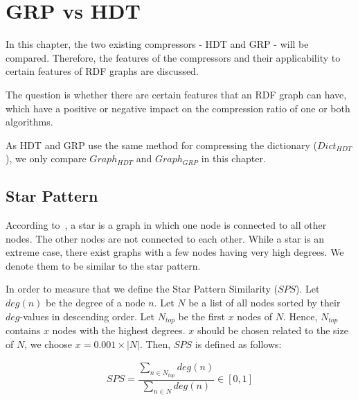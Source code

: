 \section{GRP vs HDT}\label{sec:approachGRPvsHDT}

In this chapter, the two existing compressors - HDT and GRP - will be compared. Therefore, the features of the compressors and their applicability to certain features of RDF graphs are discussed.

The question is whether there are certain features that an RDF graph can have, which have a positive or negative impact on the compression ratio of one or both algorithms. 

As HDT and GRP use the same method for compressing the dictionary ($Dict_{HDT}$), we only compare $Graph_{HDT}$ and $Graph_{GRP}$ in this chapter.



\subsection{Star Pattern}\label{sec:approachStarPattern}

According to~\cite{stargraph}, a star is a graph in which one node is connected to all other nodes. The other nodes are not connected to each other. While a star is an extreme case, there exist graphs with a few nodes having very high degrees. We denote them to be similar to the star pattern. 

In order to measure that we define the Star Pattern Similarity ($SPS$). Let $deg(n)$ be the degree of a node $n$. Let $N$ be a list of all nodes sorted by their $deg$-values in descending order.  Let $N_{top}$ be the first $x$ nodes of $N$. Hence, $N_{top}$ contains $x$ nodes with the highest degrees. $x$ should be chosen related to the size of $N$, we choose $x=0.001 \times |N|$.  Then, $SPS$ is defined as follows:

\begin{align*}
SPS=\dfrac{\sum_{n \in N_{top}} deg(n)  }{\sum_{n \in N} deg(n)} \in [0,1]
\end{align*}

